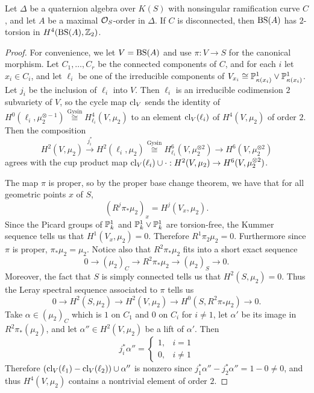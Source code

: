 \begin{prop}
Let $\Delta$ be a quaternion algebra over $K(S)$ with nonsingular ramification curve $C$, and let $A$ be a maximal $\mathcal{O}_S$-order in $\Delta$.  If $C$ is disconnected, then $\textnormal{BS}(A)$ has $2$-torsion in $H^4(\textnormal{BS}(A),\mathbb{Z}_2)$.
\end{prop}
\begin{proof}
For convenience, we let $V = \textnormal{BS}(A)$ and use $\pi: V\rightarrow S$ for the canonical morphism.  Let $C_1,\dots, C_r$ be the connected components of $C$, and for each $i$ let $x_i\in C_i$, and let $\ell_i$ be one of the irreducible components of $V_{x_i}\cong \mathbb{P}^1_{\kappa(x_i)}\vee\mathbb{P}^1_{\kappa(x_i)}$.  Let $j_i$ be the inclusion of $\ell_i$ into $V$.  Then $\ell_i$ is an irreducible codimension $2$ subvariety of $V$, so the cycle map $\textnormal{cl}_V$ sends the identity of $H^0(\ell_i,\mu_2^{\otimes-1})\stackrel{\text{Gysin}}{\cong} H^4_{\ell_i}(V,\mu_2)$ to an element $\textnormal{cl}_{V}(\ell_i)$ of $H^4(V,\mu_2)$ of order $2$.
Then the composition
$$H^2(V,\mu_2)\xrightarrow{j_i^*} H^2(\ell_i,\mu_2)\stackrel{\text{Gysin}}{\cong} H^6_{\ell_i}(V,\mu_2^{\otimes 2})\rightarrow H^6(V,\mu_2^{\otimes 2})$$
agrees with the cup product map $\textnormal{cl}_V(\ell_i)\cup\cdot: H^2(V,\mu_2)\rightarrow H^6(V,\mu_2^{\otimes 2})$.

The map $\pi$ is proper, so by the proper base change theorem, we have that for all geometric points $x$ of $S$,
$$(R^j\pi_*\mu_2)_x = H^j(V_x,\mu_2).$$
Since the Picard groups of $\mathbb{P}^1_k$ and $\mathbb{P}^1_k\vee\mathbb{P}^1_k$ are torsion-free, the Kummer sequence tells us that $H^1(V_x,\mu_2) = 0$.  Therefore $R^1\pi_2\mu_2 = 0$.  Furthermore since $\pi$ is proper, $\pi_*\mu_2 = \mu_2$.  Notice also that $R^2\pi_*\mu_2$ fits into a short exact sequence
$$0\rightarrow (\mu_2)_C\rightarrow R^2\pi_*\mu_2\rightarrow (\mu_2)_S\rightarrow 0.$$
Moreover, the fact that $S$ is simply connected tells us that $H^2(S,\mu_2) = 0$.  Thus the Leray spectral sequence associated to $\pi$ tells us
$$0\rightarrow H^2(S,\mu_2)\rightarrow H^2(V,\mu_2)\rightarrow H^0(S,R^2\pi_*\mu_2)\rightarrow 0.$$
Take $\alpha\in (\mu_2)_C$ which is $1$ on $C_1$ and $0$ on $C_i$ for $i\neq 1$, let $\alpha'$ be its image in $R^2\pi_*(\mu_2)$, and let $\alpha''\in H^2(V,\mu_2)$ be a lift of $\alpha'$.  Then
$$j_i^*\alpha'' = \left\lbrace\begin{array}{cc}
1, & i=1\\
0, & i\neq 1
\end{array}\right.$$
Therefore $(\textnormal{cl}_V(\ell_1)-\textnormal{cl}_V(\ell_2))\cup \alpha''$ is nonzero since $j_1^*\alpha''-j_2^*\alpha'' = 1-0\neq 0$, and thus $H^4(V,\mu_2)$ contains a nontrivial element of order $2$.
\end{proof}


